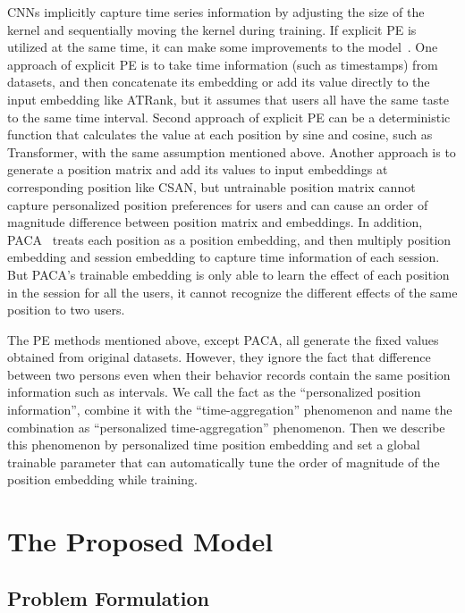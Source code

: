 \documentclass[preprint,12pt]{elsarticle}
\begin{document}
\begin{sloppypar}
CNNs implicitly capture time series information by adjusting the size of the kernel and sequentially moving the kernel during training. If explicit PE is utilized at the same time, it can make some improvements to the model~\cite{nguyen2015event}. One approach of explicit PE is to take time information (such as timestamps) from datasets, and then concatenate its embedding or add its value directly to the input embedding like ATRank, but it assumes that users all have the same taste to the same time interval. Second approach of explicit PE can be a deterministic function that calculates the value at each position by sine and cosine, such as Transformer, with the same assumption mentioned above. Another approach is to generate a position matrix and add its values to input embeddings at corresponding position like CSAN, but untrainable position matrix cannot capture personalized position preferences for users and can cause an order of magnitude difference between position matrix and embeddings. In addition, PACA~\cite{cao2020position} treats each position as a position embedding, and then multiply position embedding and session embedding to capture time information of each session. But PACA's trainable embedding is only able to learn the effect of each position in the session for all the users, it cannot recognize the different effects of the same position to two users.

The PE methods mentioned above, except PACA, all generate the fixed values obtained from original datasets. However, they ignore the fact that difference between two persons even when their behavior records contain the same position information such as intervals. We call the fact as the ``personalized position information'', combine it with the ``time-aggregation'' phenomenon and name the combination as ``personalized time-aggregation'' phenomenon. Then we describe this phenomenon by personalized time position embedding and set a global trainable parameter that can automatically tune the order of magnitude of the position embedding while training.

\section{The Proposed Model}
\label{sec_proposed_model}

\subsection{Problem Formulation}


\end{sloppypar}
\end{document}
